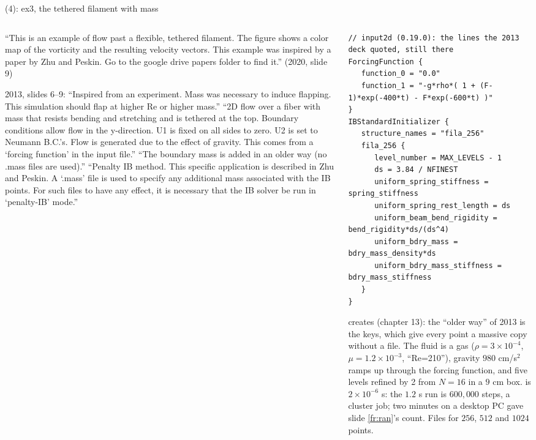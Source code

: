 \documentclass[aspectratio=169,11pt]{beamer}
\begin{document}
\begin{frame}[fragile]{ (4): ex3, the tethered filament with mass}
\label{fr:ib3}
\begin{columns}[T,onlytextwidth]
\begin{column}{0.46\textwidth}
\footnotesize ``This is an example of flow past a flexible, tethered filament. The figure shows a color map of the vorticity and the resulting velocity vectors. This example was inspired by a paper by Zhu and Peskin. Go to the google drive papers folder to find it.'' (2020, slide 9)
\vspace{1mm}

\scriptsize 2013, slides 6--9: ``Inspired from an experiment. Mass was necessary to induce flapping. This simulation should flap at higher Re or higher mass.'' ``2D flow over a fiber with mass that resists bending and stretching and is tethered at the top. Boundary conditions allow flow in the y-direction. U1 is fixed on all sides to zero. U2 is set to Neumann B.C.'s. Flow is generated due to the effect of gravity. This comes from a `forcing function' in the input file.'' ``The boundary mass is added in an older way (no .mass files are used).'' ``Penalty IB method. This specific application is described in Zhu and Peskin. A `.mass' file is used to specify any additional mass associated with the IB points. For such files to have any effect, it is necessary that the IB solver be run in `penalty-IB' mode.''
\end{column}
\begin{column}{0.52\textwidth}
\begin{lstlisting}[style=inputtiny,belowskip=0pt]
// input2d (0.19.0): the lines the 2013 deck quoted, still there
ForcingFunction {
   function_0 = "0.0"
   function_1 = "-g*rho*( 1 + (F-1)*exp(-400*t) - F*exp(-600*t) )"
}
IBStandardInitializer {
   structure_names = "fila_256"
   fila_256 {
      level_number = MAX_LEVELS - 1
      ds = 3.84 / NFINEST
      uniform_spring_stiffness = spring_stiffness
      uniform_spring_rest_length = ds
      uniform_beam_bend_rigidity = bend_rigidity*ds/(ds^4)
      uniform_bdry_mass = bdry_mass_density*ds
      uniform_bdry_mass_stiffness = bdry_mass_stiffness
   }
}
\end{lstlisting}
\scriptsize {} creates  (chapter 13): the ``older way'' of 2013 is the  keys, which give every point a massive copy without a  file. The fluid is a gas ($\rho = 3\times10^{-4}$, $\mu = 1.2\times10^{-3}$, ``Re=210''), gravity $980$ cm/s$^2$ ramps up through the forcing function, and five levels refined by 2 from $N = 16$ in a $9$ cm box.  is $2\times10^{-6}$ s: the $1.2$ s run is $600{,}000$ steps, a cluster job; two minutes on a desktop PC gave slide \ref{fr:ran}'s count. Files for $256$, $512$ and $1024$ points.
\end{column}
\end{columns}
\end{frame}
\end{document}
